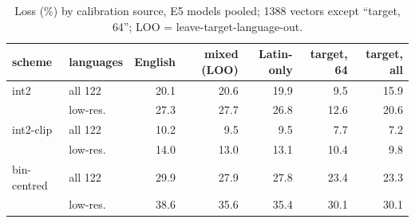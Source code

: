 \begin{table}[t]\centering\footnotesize
\begin{tabular}{llrrrrr}
\toprule
scheme & languages & English & mixed (LOO) & Latin-only & target, 64 & target, all \\
\midrule
int2 & all 122 & 20.1 & 20.6 & 19.9 & 9.5 & 15.9 \\
 & low-res. & 27.3 & 27.7 & 26.8 & 12.6 & 20.6 \\
int2-clip & all 122 & 10.2 & 9.5 & 9.5 & 7.7 & 7.2 \\
 & low-res. & 14.0 & 13.0 & 13.1 & 10.4 & 9.8 \\
bin-centred & all 122 & 29.9 & 27.9 & 27.8 & 23.4 & 23.3 \\
 & low-res. & 38.6 & 35.6 & 35.4 & 30.1 & 30.1 \\
\bottomrule
\end{tabular}
\caption{Loss (\%) by calibration source, E5 models pooled; 1388 vectors except ``target, 64''; LOO = leave-target-language-out.}\label{tab:calib}
\end{table}